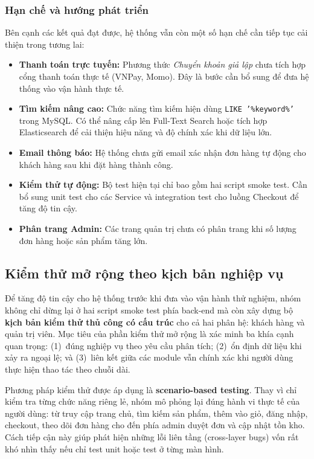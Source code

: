 \documentclass[11pt, a4paper]{article}
\begin{document}
\subsubsection{Hạn chế và hướng phát triển}

Bên cạnh các kết quả đạt được, hệ thống vẫn còn một số hạn chế cần
tiếp tục cải thiện trong tương lai:

\begin{itemize}[leftmargin=*]
    \item \textbf{Thanh toán trực tuyến:} Phương thức \textit{Chuyển khoản giả lập}
          chưa tích hợp cổng thanh toán thực tế (VNPay, Momo). Đây là bước
          cần bổ sung để đưa hệ thống vào vận hành thực tế.
    \item \textbf{Tìm kiếm nâng cao:} Chức năng tìm kiếm hiện dùng
          \texttt{LIKE '\%keyword\%'} trong MySQL. Có thể nâng cấp lên
          Full-Text Search hoặc tích hợp Elasticsearch để cải thiện
          hiệu năng và độ chính xác khi dữ liệu lớn.
    \item \textbf{Email thông báo:} Hệ thống chưa gửi email xác nhận đơn
          hàng tự động cho khách hàng sau khi đặt hàng thành công.
    \item \textbf{Kiểm thử tự động:} Bộ test hiện tại chỉ bao gồm hai
          script smoke test. Cần bổ sung unit test cho các Service và
          integration test cho luồng Checkout để tăng độ tin cậy.
    \item \textbf{Phân trang Admin:} Các trang quản trị chưa có phân trang
          khi số lượng đơn hàng hoặc sản phẩm tăng lớn.
\end{itemize}

\clearpage
\subsection{Kiểm thử mở rộng theo kịch bản nghiệp vụ}

Để tăng độ tin cậy cho hệ thống trước khi đưa vào vận hành thử nghiệm,
nhóm không chỉ dừng lại ở hai script smoke test phía back-end mà còn xây
dựng bộ \textbf{kịch bản kiểm thử thủ công có cấu trúc} cho cả hai phân hệ:
khách hàng và quản trị viên. Mục tiêu của phần kiểm thử mở rộng là xác minh
ba khía cạnh quan trọng: (1)~đúng nghiệp vụ theo yêu cầu phân tích;
(2)~ổn định dữ liệu khi xảy ra ngoại lệ; và (3)~liên kết giữa các module
vẫn chính xác khi người dùng thực hiện thao tác theo chuỗi dài.

Phương pháp kiểm thử được áp dụng là \textbf{scenario-based testing}.
Thay vì chỉ kiểm tra từng chức năng riêng lẻ, nhóm mô phỏng lại đúng hành vi
thực tế của người dùng: từ truy cập trang chủ, tìm kiếm sản phẩm, thêm vào giỏ,
đăng nhập, checkout, theo dõi đơn hàng cho đến phía admin duyệt đơn và cập nhật
tồn kho. Cách tiếp cận này giúp phát hiện những lỗi liên tầng (cross-layer bugs)
vốn rất khó nhìn thấy nếu chỉ test unit hoặc test ở từng màn hình.
\end{document}
